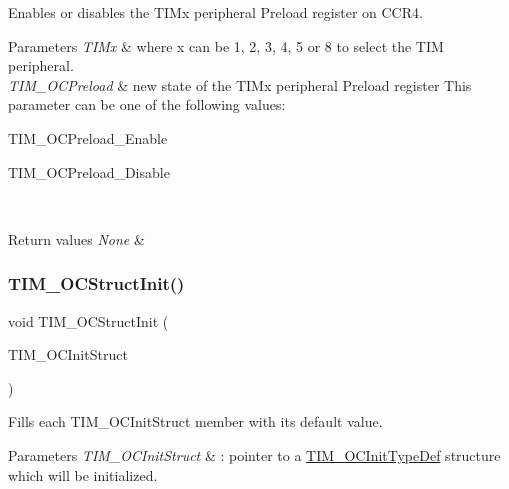 Enables or disables the T\+I\+Mx peripheral Preload register on C\+C\+R4. 


\begin{DoxyParams}{Parameters}
{\em T\+I\+Mx} & where x can be 1, 2, 3, 4, 5 or 8 to select the T\+IM peripheral. \\
\hline
{\em T\+I\+M\+\_\+\+O\+C\+Preload} & new state of the T\+I\+Mx peripheral Preload register This parameter can be one of the following values\+: \begin{DoxyItemize}
\item T\+I\+M\+\_\+\+O\+C\+Preload\+\_\+\+Enable \item T\+I\+M\+\_\+\+O\+C\+Preload\+\_\+\+Disable \end{DoxyItemize}
\\
\hline
\end{DoxyParams}

\begin{DoxyRetVals}{Return values}
{\em None} & \\
\hline
\end{DoxyRetVals}
\mbox{\label{group___t_i_m___exported___functions_ga394683c78ae02837882e36014e11643e}} 
\subsubsection{\texorpdfstring{TIM\_OCStructInit()}{TIM\_OCStructInit()}}
{\footnotesize\ttfamily void T\+I\+M\+\_\+\+O\+C\+Struct\+Init (\begin{DoxyParamCaption}\item[{\mbox{\hyperlink{struct_t_i_m___o_c_init_type_def}{T\+I\+M\+\_\+\+O\+C\+Init\+Type\+Def}} $\ast$}]{T\+I\+M\+\_\+\+O\+C\+Init\+Struct }\end{DoxyParamCaption})}



Fills each T\+I\+M\+\_\+\+O\+C\+Init\+Struct member with its default value. 


\begin{DoxyParams}{Parameters}
{\em T\+I\+M\+\_\+\+O\+C\+Init\+Struct} & \+: pointer to a \mbox{\hyperlink{struct_t_i_m___o_c_init_type_def}{T\+I\+M\+\_\+\+O\+C\+Init\+Type\+Def}} structure which will be initialized. \\
\hline
\end{DoxyParams}

